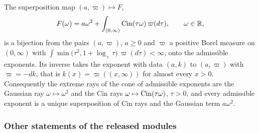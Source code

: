 \begin{theorem}
\label{thm:cited-A15}

The superposition map $(a, \varpi) \mapsto F$,
\[
  F(\omega) = a\omega^2 + \int_{(0,\infty)}\operatorname{Cin}(\tau\omega)\,\varpi(d\tau), \qquad \omega \in \mathbb{R},
\]
is a bijection from the pairs $(a, \varpi)$, $a \ge 0$ and $\varpi$ a positive Borel measure on
$(0,\infty)$ with $\int\min\bigl(\tau^2, 1 + \log_+\tau\bigr)\,\varpi(d\tau) < \infty$, onto the
admissible exponents. Its inverse takes the exponent with data $(a, k)$ to $(a, \varpi)$ with
$\varpi = -dk$, that is $k(x) = \varpi((x,\infty))$ for almost every $x > 0$. Consequently the
extreme rays of the cone of admissible exponents are the Gaussian ray $\omega \mapsto \omega^2$
and the Cin rays $\omega \mapsto \operatorname{Cin}(\tau\omega)$, $\tau > 0$, and every admissible exponent is a
unique superposition of Cin rays and the Gaussian term $a\omega^2$.
\end{theorem}

\subsubsection{Other statements of the released modules}
\label{subsec:cited-released}

